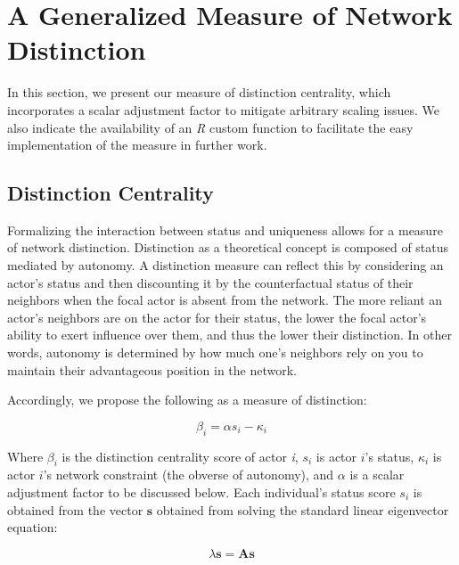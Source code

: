 \documentclass[12pt]{article}
\begin{document}
\section{A Generalized Measure of Network Distinction}
In this section, we present our measure of distinction centrality, which incorporates a scalar adjustment factor to mitigate arbitrary scaling issues. We also indicate the availability of an \textit{R} custom function to facilitate the easy implementation of the measure in further work.

\subsection{Distinction Centrality}

Formalizing the interaction between status and uniqueness allows for a measure of network distinction. Distinction as a theoretical concept is composed of status mediated by autonomy. A distinction measure can reflect this by considering an actor's status and then discounting it by the counterfactual status of their neighbors when the focal actor is absent from the network. The more reliant an actor's neighbors are on the actor for their status, the lower the focal actor's ability to exert influence over them, and thus the lower their distinction. In other words, autonomy is determined by how much one's neighbors rely on you to maintain their advantageous position in the network. 

Accordingly, we propose the following as a measure of distinction:

\begin{equation}
\beta_i= \alpha s_i - \kappa_i
\label{eq:distinction}
\end{equation}

Where $\beta_i$ is the distinction centrality score of actor \textit{i}, $s_i$ is actor $i$'s status, $\kappa_i$ is actor $i$'s network constraint (the obverse of autonomy), and $\alpha$ is a scalar adjustment factor to be discussed below. Each individual's status score $s_i$ is obtained from the vector $\mathbf{s}$ obtained from solving the standard linear eigenvector equation:

\begin{equation}
\lambda\mathbf{s}= \mathbf{A}\mathbf{s}
\label{eq:eigen}
\end{equation}
\end{document}
